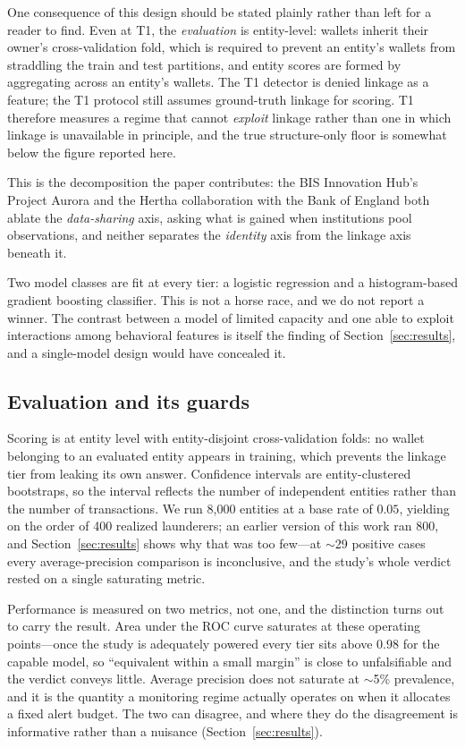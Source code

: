 \documentclass[11pt]{article}
\begin{document}
One consequence of this design should be stated plainly rather than left for a reader to find. Even
at T1, the \emph{evaluation} is entity-level: wallets inherit their owner's cross-validation fold,
which is required to prevent an entity's wallets from straddling the train and test partitions, and
entity scores are formed by aggregating across an entity's wallets. The T1 detector is denied
linkage as a feature; the T1 protocol still assumes ground-truth linkage for scoring. T1 therefore
measures a regime that cannot \emph{exploit} linkage rather than one in which linkage is
unavailable in principle, and the true structure-only floor is somewhat below the figure reported
here.

This is the decomposition the paper contributes: the BIS Innovation Hub's Project Aurora
\citep{BISAurora2023} and the Hertha collaboration with the Bank of England
\citep{BISHertha2025} both ablate the \emph{data-sharing} axis, asking what
is gained when institutions pool observations, and neither separates the \emph{identity} axis from
the linkage axis beneath it.

Two model classes are fit at every tier: a logistic regression and a histogram-based gradient
boosting classifier. This is not a horse race, and we do not report a winner. The contrast between a
model of limited capacity and one able to exploit interactions among behavioral features is itself
the finding of Section~\ref{sec:results}, and a single-model design would have concealed it.

\subsection{Evaluation and its guards}

Scoring is at entity level with entity-disjoint cross-validation folds: no wallet belonging to an
evaluated entity appears in training, which prevents the linkage tier from leaking its own answer.
Confidence intervals are entity-clustered bootstraps, so the interval reflects the number of
independent entities rather than the number of transactions. We run 8{,}000 entities at a base rate
of $0.05$, yielding on the order of 400 realized launderers; an earlier version of this work ran
800, and Section~\ref{sec:results} shows why that was too few---at $\sim$29 positive cases every
average-precision comparison is inconclusive, and the study's whole verdict rested on a single
saturating metric.

Performance is measured on two metrics, not one, and the distinction turns out to carry the result.
Area under the ROC curve saturates at these operating points---once the study is adequately powered
every tier sits above $0.98$ for the capable model, so ``equivalent within a small margin'' is close
to unfalsifiable and the verdict conveys little. Average precision does not saturate at $\sim$5\%
prevalence, and it is the quantity a monitoring regime actually operates on when it allocates a fixed
alert budget. The two can disagree, and where they do the disagreement is informative rather than a
nuisance (Section~\ref{sec:results}).
\end{document}
